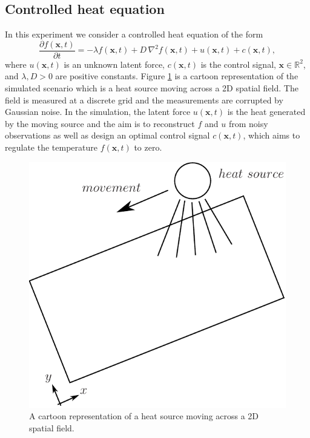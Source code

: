 \documentclass[journal]{IEEEtran}
\newcommand{\simo}[1]{{\color{red}#1}}
\begin{document}


\subsection{Controlled heat equation}

In this experiment we consider a controlled heat equation of the form
%
\begin{equation}
  \frac{\partial f(\mathbf{x},t)}{\partial t} = - \lambda f(\mathbf{x},t) + D \, \nabla^2 f(\mathbf{x},t)
  + u(\mathbf{x},t) + c(\mathbf{x},t),
\end{equation}
%
where $u(\mathbf{x},t)$ is an unknown latent force, $c(\mathbf{x},t)$ is the control signal, $\mathbf{x} \in \mathbb{R}^2$, and $\lambda,D > 0$ are positive constants. Figure \ref{cartoon:heatpde} is a cartoon representation of the simulated scenario which is a heat source moving across a 2D spatial field. The field is measured at a discrete grid and the measurements are corrupted by Gaussian noise. In the simulation, the latent force $u(\mathbf{x},t)$ is the heat generated by the moving source and the aim is to reconstruct $f$ and $u$ from noisy observations as well as design an optimal control signal $c(\mathbf{x},t)$, which aims to regulate the temperature $f(\mathbf{x},t)$ to zero.

\begin{figure}[!t]
\centering
\includegraphics[width=0.5\columnwidth]{heatpde}
\caption{A cartoon representation of a heat source moving across a 2D spatial field.}
\label{cartoon:heatpde}
\end{figure}
\end{document}

